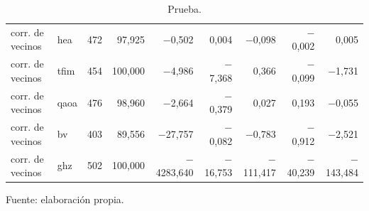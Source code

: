 \begin{table}[htbp]
{\begin{tabular}{@{}llrrrrrrr@{}}
        corr. de vecinos & hea & 472 & 97,925 & $-$0,502 & 0,004 & $-$0,098 & $-$0,002 & 0,005 \\
        corr. de vecinos & tfim & 454 & 100,000 & $-$4,986 & $-$7,368 & 0,366 & $-$0,099 & $-$1,731 \\
        corr. de vecinos & qaoa & 476 & 98,960 & $-$2,664 & $-$0,379 & 0,027 & 0,193 & $-$0,055 \\
        corr. de vecinos & bv & 403 & 89,556 & $-$27,757 & $-$0,082 & $-$0,783 & $-$0,912 & $-$2,521 \\
        corr. de vecinos & ghz & 502 & 100,000 & $-$4283,640 & $-$16,753 & $-$111,417 & $-$40,239 & $-$143,484 \\
        \bottomrule
    \end{tabular}}

    \caption{Prueba.}
    \label{tab:e_tipo_r2_f}

    {\footnotesize Fuente: elaboración propia.}
\end{table}
